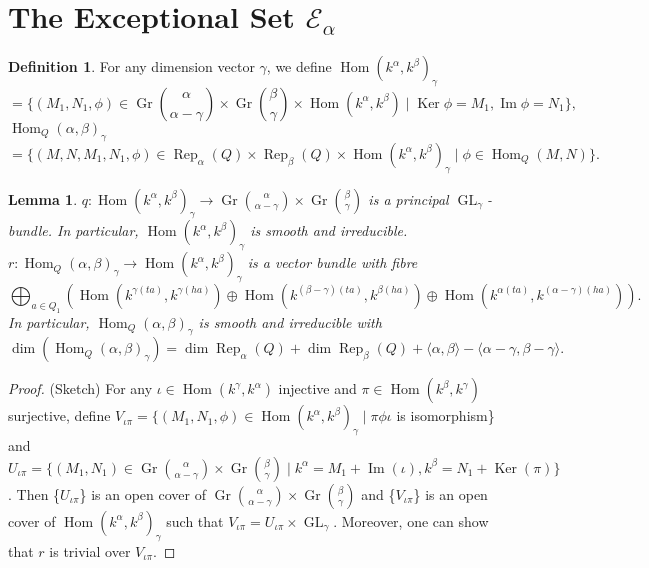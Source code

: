 \documentclass{amsart}
\newtheorem{lemma}[theorem]{Lemma}
\theoremstyle{definition}
\newtheorem{definition}[theorem]{Definition}
\theoremstyle{remark}
\numberwithin{equation}{section}
\begin{document}
\section{The Exceptional Set ${\mathcal{{E}}}_\alpha$} \label{S:FR}
\begin{definition}
For any dimension vector $\gamma$, we define ${\operatorname{Hom}}(k^\alpha,k^\beta)_\gamma$
$$=\{(M_1,N_1,\phi)\in {\operatorname{Gr}} \binom{\alpha}{\alpha-\gamma}\times {\operatorname{Gr}} \binom{\beta}{\gamma} \times {\operatorname{Hom}}(k^\alpha,k^\beta)\mid {\operatorname{Ker}}\phi=M_1, {\operatorname{Im}}\phi=N_1\},$$
${\operatorname{Hom}}_Q(\alpha,\beta)_\gamma$
$$=\{(M,N,M_1,N_1,\phi)\in {\operatorname{Rep}}_\alpha(Q)\times{\operatorname{Rep}}_\beta(Q)\times{\operatorname{Hom}}(k^\alpha,k^\beta)_\gamma \mid \phi\in{\operatorname{Hom}}_Q(M,N)\}.$$
\end{definition}

\begin{lemma}
$q:{\operatorname{Hom}}(k^\alpha,k^\beta)_\gamma \to {\operatorname{Gr}}\binom{\alpha}{\alpha-\gamma}\times {\operatorname{Gr}}\binom{\beta}{\gamma}$ is a principal ${\operatorname{GL}}_\gamma$-bundle. In particular, ${\operatorname{Hom}}(k^\alpha,k^\beta)_\gamma$ is smooth and irreducible.\\
$r:{\operatorname{Hom}}_Q(\alpha,\beta)_\gamma\to {\operatorname{Hom}}(k^\alpha,k^\beta)_\gamma$ is a vector bundle with fibre
$$\bigoplus_{a\in Q_1}({\operatorname{Hom}}(k^{\gamma(ta)},k^{\gamma(ha)})\oplus {\operatorname{Hom}}(k^{(\beta-\gamma)(ta)},k^{\beta(ha)})\oplus {\operatorname{Hom}}(k^{\alpha(ta)},k^{(\alpha-\gamma)(ha)})).$$
In particular, ${\operatorname{Hom}}_Q(\alpha,\beta)_\gamma$ is smooth and irreducible with \begin{equation}
\dim({\operatorname{Hom}}_Q(\alpha,\beta)_\gamma)=\dim{\operatorname{Rep}}_\alpha(Q)+\dim{\operatorname{Rep}}_\beta(Q)+{\langle{\alpha,\beta}\rangle}-{\langle{\alpha-\gamma,\beta-\gamma}\rangle}.
\end{equation}
\end{lemma}

\begin{proof}
(Sketch) For any $\iota\in{\operatorname{Hom}}(k^\gamma,k^\alpha)$ injective and $\pi\in{\operatorname{Hom}}(k^\beta,k^\gamma)$ surjective, define $V_{\iota\pi}=\{(M_1,N_1,\phi)\in{\operatorname{Hom}}(k^\alpha,k^\beta)_\gamma\mid \pi\phi\iota$ is isomorphism\} and $U_{\iota\pi}=\{(M_1,N_1)\in{\operatorname{Gr}} \binom{\alpha}{\alpha-\gamma}\times {\operatorname{Gr}} \binom{\beta}{\gamma}\mid k^\alpha=M_1+{\operatorname{Im}}(\iota), k^\beta=N_1+{\operatorname{Ker}}(\pi)\}$. Then \{$U_{\iota\pi}$\} is an open cover of ${\operatorname{Gr}} \binom{\alpha}{\alpha-\gamma}\times {\operatorname{Gr}} \binom{\beta}{\gamma}$ and  \{$V_{\iota\pi}$\} is an open cover of ${\operatorname{Hom}}(k^\alpha,k^\beta)_\gamma$ such that $V_{\iota\pi}=U_{\iota\pi}\times{\operatorname{GL}}_\gamma$. Moreover, one can show that $r$ is trivial over $V_{\iota\pi}$.
\end{proof}
\end{document}
